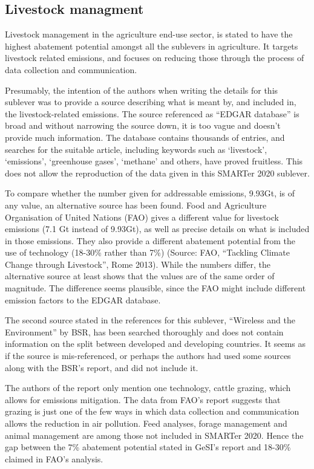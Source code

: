\subsection{Livestock managment} 

Livestock management in the agriculture end-use sector, is stated to have the highest abatement potential amongst all the sublevers in agriculture. It targets livestock related emissions, and focuses on reducing those through the process of data collection and communication.

Presumably, the intention of the authors when writing the details for this sublever was to provide a source describing what is meant by, and included in, the livestock-related emissions. The source referenced as “EDGAR database” is broad and without narrowing the source down, it is too vague and doesn’t provide much information. The database contains thousands of entries, and searches for the suitable article, including keywords such as ‘livestock’, ‘emissions’, ‘greenhouse gases’, ‘methane’ and others, have proved fruitless. This does not allow the reproduction of the data given in this SMARTer 2020 sublever.

To compare whether the number given for addressable emissions, 9.93Gt, is of any value, an alternative source has been found. Food and Agriculture Organisation of United Nations (FAO) gives a different value for livestock emissions (7.1 Gt instead of 9.93Gt), as well as precise details on what is included in those emissions. They also provide a different abatement potential from the use of technology (18-30\% rather than 7\%) (Source: FAO, “Tackling Climate Change through Livestock”, Rome 2013). While the numbers differ, the alternative source at least shows that the values are of the same order of magnitude. The difference seems plausible, since the FAO might include different emission factors to the EDGAR database. 

The second source stated in the references for this sublever, “Wireless and the Environment” by BSR, has been searched thoroughly and does not contain information on the split between developed and developing countries. It seems as if the source is mis-referenced, or perhaps the authors had used some sources along with the BSR’s report, and did not include it.

The authors of the report only mention one technology, cattle grazing, which allows for emissions mitigation. The data from FAO’s report suggests that grazing is just one of the few ways in which data collection and communication allows the reduction in air pollution. Feed analyses, forage management and animal management are among those not included in SMARTer 2020. Hence the gap between the 7\% abatement potential stated in GeSI’s report and 18-30\% claimed in FAO’s analysis. 

